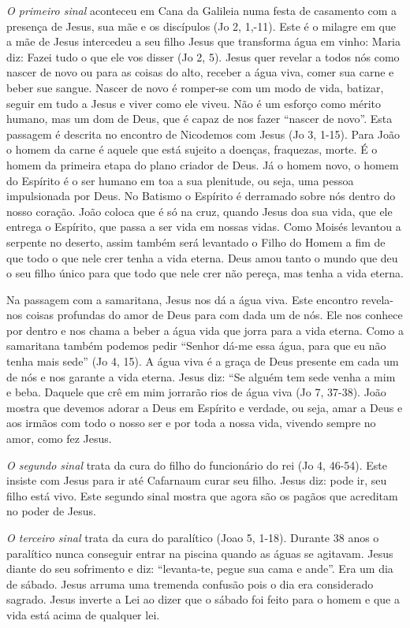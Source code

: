 \documentclass[
]{book}
\begin{document}
\emph{O primeiro sinal} aconteceu em Cana da Galileia numa festa de casamento com a presença de Jesus, sua mãe e os discípulos (Jo 2, 1,-11). Este é o milagre em que a mãe de Jesus intercedeu a seu filho Jesus que transforma água em vinho: Maria diz: Fazei tudo o que ele vos disser (Jo 2, 5). Jesus quer revelar a todos nós como nascer de novo ou para as coisas do alto, receber a água viva, comer sua carne e beber sue sangue. Nascer de novo é romper-se com um modo de vida, batizar, seguir em tudo a Jesus e viver como ele viveu. Não é um esforço como mérito humano, mas um dom de Deus, que é capaz de nos fazer ``nascer de novo''. Esta passagem é descrita no encontro de Nicodemos com Jesus (Jo 3, 1-15). Para João o homem da carne é aquele que está sujeito a doenças, fraquezas, morte. É o homem da primeira etapa do plano criador de Deus. Já o homem novo, o homem do Espírito é o ser humano em toa a sua plenitude, ou seja, uma pessoa impulsionada por Deus. No Batismo o Espírito é derramado sobre nós dentro do nosso coração. João coloca que é só na cruz, quando Jesus doa sua vida, que ele entrega o Espírito, que passa a ser vida em nossas vidas. Como Moisés levantou a serpente no deserto, assim também será levantado o Filho do Homem a fim de que todo o que nele crer tenha a vida eterna. Deus amou tanto o mundo que deu o seu filho único para que todo que nele crer não pereça, mas tenha a vida eterna.

Na passagem com a samaritana, Jesus nos dá a água viva. Este encontro revela-nos coisas profundas do amor de Deus para com dada um de nós. Ele nos conhece por dentro e nos chama a beber a água vida que jorra para a vida eterna. Como a samaritana também podemos pedir ``Senhor dá-me essa água, para que eu não tenha mais sede'' (Jo 4, 15). A água viva é a graça de Deus presente em cada um de nós e nos garante a vida eterna. Jesus diz: ``Se alguém tem sede venha a mim e beba. Daquele que crê em mim jorrarão rios de água viva (Jo 7, 37-38). João mostra que devemos adorar a Deus em Espírito e verdade, ou seja, amar a Deus e aos irmãos com todo o nosso ser e por toda a nossa vida, vivendo sempre no amor, como fez Jesus.

\emph{O segundo sinal} trata da cura do filho do funcionário do rei (Jo 4, 46-54). Este insiste com Jesus para ir até Cafarnaum curar seu filho. Jesus diz: pode ir, seu filho está vivo. Este segundo sinal mostra que agora são os pagãos que acreditam no poder de Jesus.

\emph{O terceiro sinal} trata da cura do paralítico (Joao 5, 1-18). Durante 38 anos o paralítico nunca conseguir entrar na piscina quando as águas se agitavam. Jesus diante do seu sofrimento e diz: ``levanta-te, pegue sua cama e ande''. Era um dia de sábado. Jesus arruma uma tremenda confusão pois o dia era considerado sagrado. Jesus inverte a Lei ao dizer que o sábado foi feito para o homem e que a vida está acima de qualquer lei.
\end{document}
